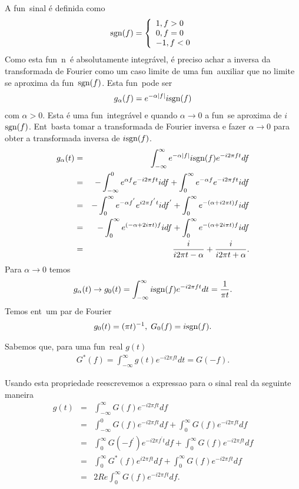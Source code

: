 A fun\cao\ sinal \'e definida como
\begin{eqnarray}
\mbox{sgn}(f) = \left\{
\begin{array}{ll}
1 , f > 0 \\
0 , f = 0 \\
-1 , f < 0
\end{array}
\right.
\end{eqnarray}
Como esta fun\cao\ n\ao\ \'e absolutamente integr\'avel, \'e
preciso achar a inversa da transformada de Fourier como um caso
limite de uma fun\cao\ auxiliar que no limite se aproxima da
fun\cao\ $\mbox{sgn}(f)$. Esta fun\cao\ pode ser
\begin{eqnarray}
g_{\alpha}(f) = e^{-\alpha \mid f\mid}i \mbox{sgn}(f)
\end{eqnarray}
com $\alpha > 0$. Esta \'e uma fun\cao\ integr\'avel e quando
$\alpha\rightarrow 0$ a fun\cao\ se aproxima de $i$ $\mbox{sgn}(f)$.
Ent\ao\ basta tomar a transformada de Fourier inversa e fazer
$\alpha\rightarrow 0$ para obter a transformada inversa de $i\mbox{sgn}(f)$.
\begin{eqnarray*}
g_{\alpha}(t) &=& \int_{-\infty}^{\infty}e^{-\alpha \mid
f\mid}i\mbox{sgn}(f)e^{-i2\pi ft}df \\
&=& -\int_{-\infty}^{0}e^{\alpha f}e^{-i2\pi ft}i df +
\int_{0}^{\infty}e^{-\alpha f}e^{-i2\pi ft}i df \\
&=& -\int_{0}^{\infty}e^{-\alpha f^{'}}e^{i2\pi f^{'}t}i df^{'} +
\int_{0}^{\infty}e^{-(\alpha+i2\pi t)f}i df \\
&=& -\int_{0}^{\infty}e^{(-\alpha+2i\pi t)f}i df +
\int_{0}^{\infty}e^{-(\alpha + 2i\pi t)f}i df \\
&=& \frac{i}{i2\pi t - \alpha} + \frac{i}{i2\pi t + \alpha}.
\end{eqnarray*}
Para $\alpha\rightarrow 0$ temos
\begin{eqnarray}
g_{\alpha}(t)\rightarrow g_{0}(t) = \int_{-\infty}^{\infty}i\mbox{sgn}(f)e^{-i2\pi ft}dt =
\frac{1}{\pi t}.
\end{eqnarray}
Temos ent\ao\ um par de Fourier
\begin{eqnarray}
g_{0}(t) = (\pi t)^{-1},\; G_{0}(f) = i\mbox{sgn}(f).
\end{eqnarray}

Sabemos que, para uma fun\cao\ real $g(t)$
\begin{eqnarray}
G^{*}(f) = \int_{-\infty}^{\infty}g(t)e^{-i2\pi ft}dt = G(-f).
\end{eqnarray}

Usando esta propriedade reescrevemos a expressao para o sinal real
da seguinte maneira
\begin{eqnarray}
g(t) &=& \int_{-\infty}^{\infty}G(f)e^{-i2\pi ft}df \\
&=& \int_{-\infty}^{0}G(f)e^{-i2\pi ft}df +
\int_{0}^{\infty}G(f)e^{-i2\pi ft}df \\
&=& \int_{0}^{\infty}G(-f^{'})e^{-i2\pi f^{'}t}df +
\int_{0}^{\infty}
G(f)e^{-i2\pi ft}df \\
&=& \int_{0}^{\infty}G^{*}(f)e^{i2\pi ft}df +
\int_{0}^{\infty}G(f)e^{-i2\pi ft}df \\
&=& 2Re\int_{0}^{\infty}G(f)e^{-i2\pi ft}df.
\end{eqnarray}

